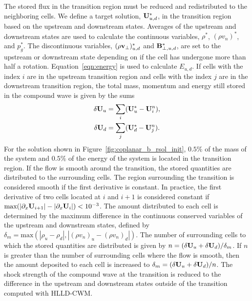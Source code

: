 The stored flux in the transition region must be reduced and redistributed to the neighboring cells.  We define a target solution, $\mathbf{U}_{u,d}^*$, in the transition region based on the upstream and downstream states.  Averages of the upstream and downstream states are used to calculate the continuous variables, $\rho^*$, $(\rho v_n)^*$, and $p_g^*$.  The discontinuous variables, $(\rho\mathbf{v}_{\perp})^*_{u,d}$ and $\mathbf{B}^*_{\perp,u,d}$, are set to the upstream or downstream state depending on if the cell has undergone more than half a rotation.  Equation~\ref{eqn:energy} is used to calculate $E_{u,d}$.  If cells with the index $i$ are in the upstream transition region and cells with the index $j$ are in the downstream transition region, the total mass, momentum and energy still stored in the compound wave is given by the sums
\begin{gather*}
\delta \mathbf{U}_u = \sum_i (\mathbf{U}_u^* -  \mathbf{U}^n_{i}), \\
\delta \mathbf{U}_d = \sum_j (\mathbf{U}_d^* - \mathbf{U}^n_{j}). 
\end{gather*}
For the solution shown in Figure~\ref{fig:coplanar_b_rsol_init}, $0.5\%$ of the mass of the system and $0.5\%$ of the energy of the system is located in the transition region.  If the flow is smooth around the transition, the stored quantities are distributed to the surrounding cells.  The region surrounding the transition is considered smooth if the first derivative is constant.  In practice, the first derivative of two cells located at $i$ and $i+1$ is considered constant if $\text{max}(|\partial_x\mathbf{U}_{i+1}| - |\partial_x\mathbf{U}_i|) < 10^{-3}$.  The amount distributed to each cell is determined by the maximum difference in the continuous conserved variables of the upstream and downstream states, defined by $\delta_m = \text{max}(|\rho_u - \rho_d|,|(\rho v_n)_{u} - (\rho v_n)_{d}|)$.  The number of surrounding cells to which the stored quantities are distributed is given by $n = (\delta \mathbf{U}_u + \delta \mathbf{U}_d)/\delta_m$.  If $n$ is greater than the number of surrounding cells where the flow is smooth, then the amount deposited to each cell is increased to $\delta_m = (\delta \mathbf{U}_u + \delta \mathbf{U}_d)/n$.  The shock strength of the compound wave at the transition is reduced to the difference in the upstream and downstream states outside of the transition computed with HLLD-CWM.  

